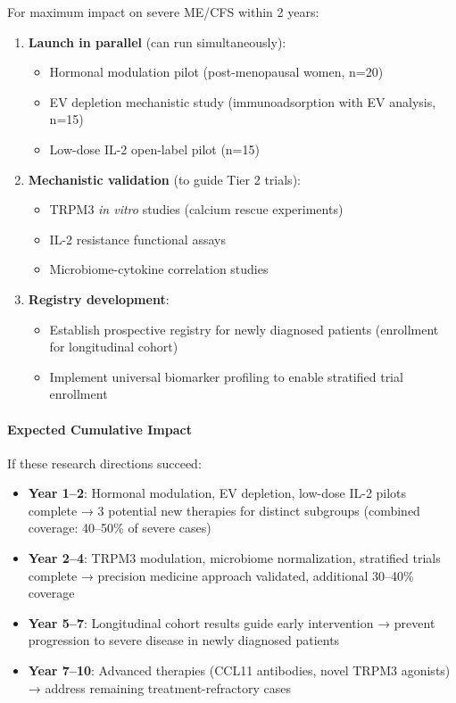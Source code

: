 For maximum impact on severe ME/CFS within 2 years:

\begin{enumerate}
    \item \textbf{Launch in parallel} (can run simultaneously):
    \begin{itemize}
        \item Hormonal modulation pilot (post-menopausal women, n=20)
        \item EV depletion mechanistic study (immunoadsorption with EV analysis, n=15)
        \item Low-dose IL-2 open-label pilot (n=15)
    \end{itemize}

    \item \textbf{Mechanistic validation} (to guide Tier 2 trials):
    \begin{itemize}
        \item TRPM3 \emph{in vitro} studies (calcium rescue experiments)
        \item IL-2 resistance functional assays
        \item Microbiome-cytokine correlation studies
    \end{itemize}

    \item \textbf{Registry development}:
    \begin{itemize}
        \item Establish prospective registry for newly diagnosed patients (enrollment for longitudinal cohort)
        \item Implement universal biomarker profiling to enable stratified trial enrollment
    \end{itemize}
\end{enumerate}

\paragraph{Expected Cumulative Impact}

If these research directions succeed:
\begin{itemize}
    \item \textbf{Year 1--2}: Hormonal modulation, EV depletion, low-dose IL-2 pilots complete → 3 potential new therapies for distinct subgroups (combined coverage: 40--50\% of severe cases)
    \item \textbf{Year 2--4}: TRPM3 modulation, microbiome normalization, stratified trials complete → precision medicine approach validated, additional 30--40\% coverage
    \item \textbf{Year 5--7}: Longitudinal cohort results guide early intervention → prevent progression to severe disease in newly diagnosed patients
    \item \textbf{Year 7--10}: Advanced therapies (CCL11 antibodies, novel TRPM3 agonists) → address remaining treatment-refractory cases
\end{itemize}

